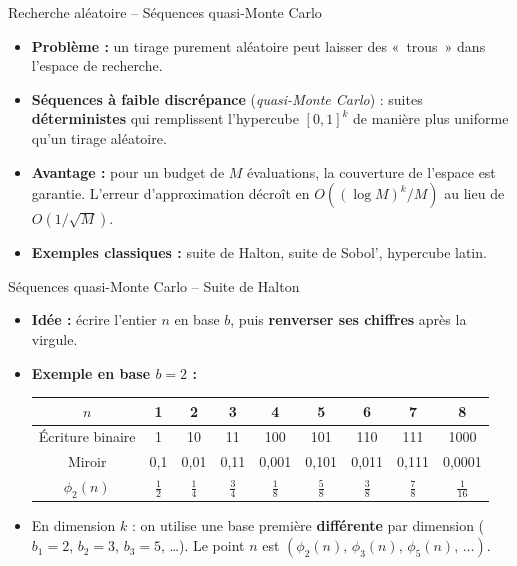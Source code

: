 \documentclass[11pt,aspectratio=169]{beamer}
\begin{document}
\begin{frame}{Recherche aléatoire -- Séquences quasi-Monte Carlo}

\begin{itemize}

\item \textbf{Problème :} un tirage purement aléatoire peut laisser des «~trous~» dans l'espace de recherche.\newline

\item \textbf{Séquences à faible discrépance} (\textit{quasi-Monte Carlo}) : suites \textbf{déterministes} qui remplissent l'hypercube $[0,1]^k$ de manière plus uniforme qu'un tirage aléatoire.\newline

\item \textbf{Avantage :} pour un budget de $M$ évaluations, la couverture de l'espace est garantie. L'erreur d'approximation décroît en $O((\log M)^k / M)$ au lieu de $O(1/\sqrt{M})$.\newline

\item \textbf{Exemples classiques :} suite de Halton, suite de Sobol', hypercube latin.

\end{itemize}

\end{frame}

\begin{frame}{Séquences quasi-Monte Carlo -- Suite de Halton}

\begin{itemize}

\item \textbf{Idée :} écrire l'entier $n$ en base $b$, puis \textbf{renverser ses chiffres} après la virgule.\newline

\item \textbf{Exemple en base $b=2$ :}

\begin{center}
\small
\begin{tabular}{ccccccccc}
  \toprule
  $n$ & 1 & 2 & 3 & 4 & 5 & 6 & 7 & 8 \\
  \midrule
  Écriture binaire & 1 & 10 & 11 & 100 & 101 & 110 & 111 & 1000 \\
  Miroir & 0{,}1 & 0{,}01 & 0{,}11 & 0{,}001 & 0{,}101 & 0{,}011 & 0{,}111 & 0{,}0001 \\
  $\phi_2(n)$ & $\frac{1}{2}$ & $\frac{1}{4}$ & $\frac{3}{4}$ & $\frac{1}{8}$ & $\frac{5}{8}$ & $\frac{3}{8}$ & $\frac{7}{8}$ & $\frac{1}{16}$ \\
  \bottomrule
\end{tabular}
\end{center}

\item En dimension $k$ : on utilise une base première \textbf{différente} par dimension ($b_1=2$, $b_2=3$, $b_3=5$, \ldots). Le point $n$ est $(\phi_2(n),\, \phi_3(n),\, \phi_5(n),\, \ldots)$.

\end{itemize}

\end{frame}
\end{document}
